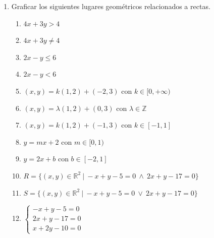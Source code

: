 \documentclass[a4paper]{article}
\newcommand{\exercise}{\item}
\begin{document}
\begin{enumerate}
\begin{enumerate} [label=(\alph*)]
		\item $s: 2x+y-1=0$ ~~y~~ $r:\left\{\begin{matrix}x=1+2t \\ y=3-t\end{matrix}\right.$
		\item $r:\left\{\begin{matrix}x=-3+2t \\ 4-t\end{matrix}\right.$ ~~y~~ $s:\displaystyle{\frac{x+6}{-4}}=\displaystyle{\frac{y-1}{2}}$.
		\item $r_1: 2x-4y=2$ ~~y~~ $r_2: x+y=0$.
		\item $r_1: x+3y=7$ ~~y~~ $r_2: (x,y)=(4,1)+\alpha (-6,2)$ con $\alpha \in\mathbb{R}$.
		\item $r: 2x-y-3=0$ ~~y~~ $s: (x,y)=(-1,0)+ k (-6,3)$ con $k\in\mathbb{R}$.
		\item $r: y=-\frac{1}{2}x+\frac{3}{2}$ ~~y~~ $s: \frac{1}{4}x+\frac{3}{4}y-3=0$.
		\item $r: (x,y)=(4,2-3k)$ ~~y~~ $s: (x,y)=(2-4h,-3)$ con $k,h\in\mathbb{R}$.
		\item $r: (x,y)=k(3,-2)+(10,5)$ con $k\in\mathbb{R}$ ~~y~~ $s: 2x+3y-35=0$.
	\end{enumerate}
	\exercise Graficar los siguientes lugares geométricos relacionados a rectas.
	\begin{multicols}{2}
	\begin{enumerate} [label=(\alph*)]
		\item $4x+3y > 4$
		\item $4x+3y \neq 4$
		\item $2x-y \leq 6$
		\item $2x-y < 6$
		\item $(x,y)=k(1,2)+(-2,3)$ con $k\in[0,+\infty)$
		\item $(x,y)=\lambda(1,2)+(0,3)$ con $\lambda\in\mathbb{Z}$
		\item $(x,y)=k(1,2)+(-1,3)$ con $k\in[-1,1]$
		\item $y=mx+2$ con $m\in[0,1)$
		\item $y=2x+b$ con $b\in[-2,1]$
		\item $R=\{(x,y) \in \mathbb{R}^2 ~|~ -x+y-5=0 ~\land~ 2x+y-17=0 \}$
		\item $S=\{(x,y) \in \mathbb{R}^2 ~|~ -x+y-5=0 ~\lor~ 2x+y-17=0 \}$
		\item $\left\{\begin{matrix}-x+y-5=0 \\ 2x+y-17=0 \\ x+2y-10=0 \end{matrix}\right.$

\end{enumerate}
\end{multicols}
\end{enumerate}
\end{document}
